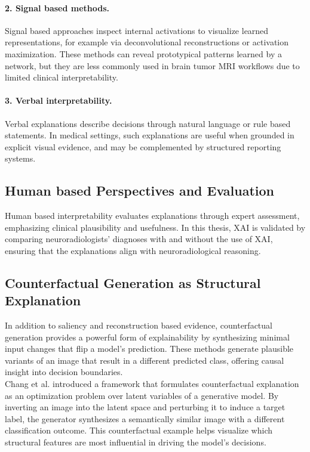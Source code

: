 \paragraph{2. Signal based methods.}
Signal based approaches inspect internal activations to visualize learned representations, for example via deconvolutional reconstructions or activation maximization. These methods can reveal prototypical patterns learned by a network, but they are less commonly used in brain tumor MRI workflows due to limited clinical interpretability.

\paragraph{3. Verbal interpretability.}
Verbal explanations describe decisions through natural language or rule based statements. In medical settings, such explanations are useful when grounded in explicit visual evidence, and may be complemented by structured reporting systems.





\subsection{Human based Perspectives and Evaluation}

Human based interpretability evaluates explanations through expert assessment, emphasizing clinical plausibility and usefulness. In this thesis, XAI is validated by comparing neuroradiologists' diagnoses with and without the use of XAI, ensuring that the explanations align with neuroradiological reasoning.



\subsection{Counterfactual Generation as Structural Explanation}

In addition to saliency and reconstruction based evidence, counterfactual generation provides a powerful form of explainability by synthesizing minimal input changes that flip a model's prediction. These methods generate plausible variants of an image that result in a different predicted class, offering causal insight into decision boundaries.\\

Chang et al. \cite{chang2019explainingimageclassifierscounterfactual} introduced a framework that formulates counterfactual explanation as an optimization problem over latent variables of a generative model. By inverting an image into the latent space and perturbing it to induce a target label, the generator synthesizes a semantically similar image with a different classification outcome. This counterfactual example helps visualize which structural features are most influential in driving the model’s decisions.\\


